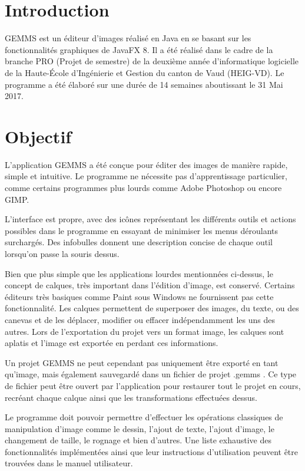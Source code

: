 \section{Introduction}
GEMMS est un éditeur d'images réalisé en Java en se basant sur les fonctionnalités graphiques de JavaFX 8. Il a été réalisé dans le cadre de la branche PRO (Projet de semestre) de la deuxième année d'informatique logicielle de la Haute-École d'Ingénierie et Gestion du canton de Vaud (HEIG-VD). 
Le programme a été élaboré sur une durée de 14 semaines aboutissant le 31 Mai 2017.

\section{Objectif}
L'application GEMMS a été conçue pour éditer des images de manière rapide, simple et intuitive. Le programme ne nécessite pas d'apprentissage particulier, comme certains programmes plus lourds comme Adobe Photoshop ou encore GIMP.

L'interface est propre, avec des icônes représentant les différents outils et actions possibles dans le programme en essayant de minimiser les menus déroulants surchargés. Des infobulles donnent une description concise de chaque outil lorsqu'on passe la souris dessus.

Bien que plus simple que les applications lourdes mentionnées ci-dessus, le concept de calques, très important dans l'édition d'image, est conservé. Certains éditeurs très basiques comme Paint sous Windows ne fournissent pas cette fonctionnalité. Les calques permettent de superposer des images, du texte, ou des canevas et de les déplacer, modifier ou effacer indépendamment les uns des autres. Lors de l'exportation du projet vers un format image, les calques sont aplatis et l'image est exportée en perdant ces informations.

Un projet GEMMS ne peut cependant pas uniquement être exporté en tant qu'image, mais également sauvegardé dans un fichier de projet \og.gemms \fg{}. Ce type de fichier peut être ouvert par l'application pour restaurer tout le projet en cours, recréant chaque calque ainsi que les transformations effectuées dessus.

Le programme doit pouvoir permettre d'effectuer les opérations classiques de manipulation d'image comme le dessin, l'ajout de texte, l'ajout d'image, le changement de taille, le rognage et bien d'autres. Une liste exhaustive des fonctionnalités implémentées ainsi que leur instructions d'utilisation peuvent être trouvées dans le manuel utilisateur.